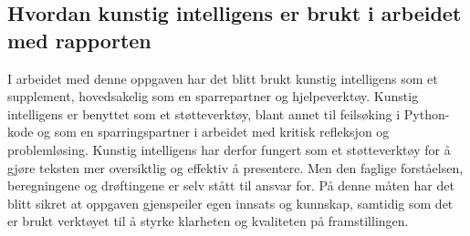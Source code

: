 \subsection{Hvordan kunstig intelligens er brukt i arbeidet med rapporten}
I arbeidet med denne oppgaven har det blitt brukt kunstig intelligens som et supplement,
hovedsakelig som en sparrepartner og hjelpeverktøy. Kunstig intelligens er benyttet som et 
støtteverktøy, blant annet til feilsøking i Python-kode og som en sparringspartner i arbeidet 
med kritisk refleksjon og problemløsing. Kunstig intelligens har derfor fungert 
som et støtteverktøy for å gjøre teksten mer oversiktlig og effektiv å
presentere. Men den faglige forståelsen, beregningene og drøftingene er selv stått til ansvar for.
På denne måten har det blitt sikret at oppgaven gjenspeiler egen innsats og kunnskap, samtidig
som det er brukt verktøyet til å styrke klarheten og kvaliteten på framstillingen.